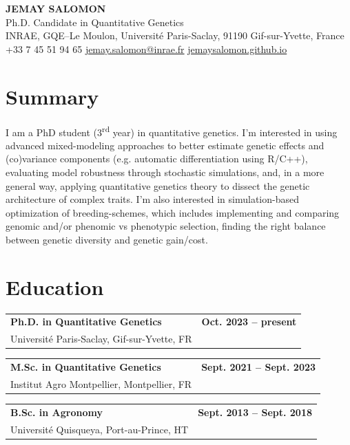 \documentclass[10pt,a4paper]{article}
\makeatletter
\newcommand{\sizeTitre}{\fontsize{11}{13.2}\selectfont}  %
\newcommand{\sizeDate} {\fontsize{10}{13.2}\selectfont}  %
\newcommand{\sizeOrg}  {\fontsize{10}{12}\selectfont}    %
\newcommand{\sizeLieu} {\fontsize{10}{12}\selectfont}    %
\newcommand{\cventry}[5][2pt]{%
  \par\noindent\begin{tabularx}{\textwidth}{@{}Xr@{}}
    {\sizeTitre\textbf{#2}} & {\sizeDate\textbf{#5}}\\
    {\sizeOrg #3}   & {\sizeLieu #4}\\
  \end{tabularx}\par\vspace{#1}}
\makeatother
\begin{document}
\pagestyle{empty}

\begin{center}
{\Huge\bfseries\color{accent} JEMAY SALOMON}\\[2pt]
{\large Ph.D. Candidate in Quantitative Genetics}\\[4pt]
INRAE, GQE--Le Moulon, Université Paris-Saclay, 91190 Gif-sur-Yvette, France\\[2pt]
+33 7 45 51 94 65 \quad\textbar\quad
\href{mailto:jemay.salomon@inrae.fr}{jemay.salomon@inrae.fr} \quad\textbar\quad
\href{https://jemaysalomon.github.io/}{jemaysalomon.github.io}
\end{center}

\section{Summary}
I am a PhD student (3\textsuperscript{rd} year) in quantitative genetics. I’m interested in using advanced mixed-modeling approaches to better estimate genetic effects and (co)variance components (e.g. automatic differentiation using R/C++), evaluating model robustness through stochastic simulations, and, in a more general way, applying quantitative genetics theory to dissect the genetic architecture of complex traits. I’m also interested in simulation-based
optimization of breeding-schemes, which includes implementing and comparing genomic and/or phenomic vs phenotypic selection, finding the right balance between genetic diversity and genetic gain/cost.

\section{Education}
\cventry[8pt]{Ph.D. in Quantitative Genetics}{Université Paris-Saclay, Gif-sur-Yvette, FR}{}{Oct. 2023 -- present}
\cventry[8pt]{M.Sc. in Quantitative Genetics}{Institut Agro Montpellier, Montpellier, FR}{}{Sept. 2021 -- Sept. 2023}
\cventry{B.Sc. in Agronomy}{Université Quisqueya, Port-au-Prince, HT}{}{Sept. 2013 -- Sept. 2018}

\end{document}
